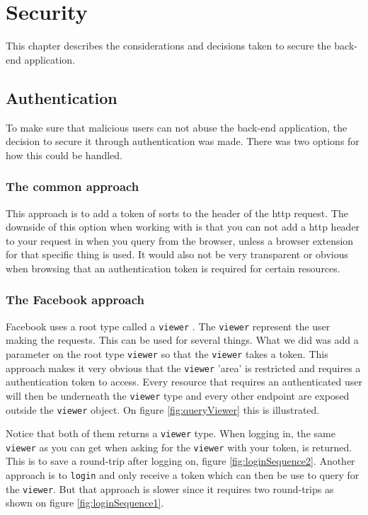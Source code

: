 \chapter{Security}
This chapter describes the considerations and decisions taken to secure the back-end application.

\section{Authentication}
To make sure that malicious users can not abuse the back-end application, the decision to secure it through authentication was made. 
There was two options for how this could be handled. 

\subsection{The common approach}
This approach is to add a token of sorts to the header of the \gls{http} request. 
The downside of this option when working with  is that you can not add a \gls{http} header to your request in  when you query from the browser, unless a browser extension for that specific thing is used. 
It would also not be very transparent or obvious when browsing  that an authentication token is required for certain resources.

\subsection{The Facebook approach}
Facebook uses a root type called a \verb+viewer+ \citep{facebook:viewer}. 
The \verb+viewer+ represent the user making the requests. 
This can be used for several things. 
What we did was add a parameter on the root type \verb+viewer+ so that the \verb+viewer+ takes a token. 
This approach makes it very obvious that the \verb+viewer+ 'area' is restricted and requires a authentication token to access. 
Every resource that requires an authenticated user will then be underneath the \verb+viewer+ type and every other endpoint are exposed outside the \verb+viewer+ object. 
On figure \ref{fig:queryViewer} this is illustrated.


Notice that both of them returns a \verb+viewer+ type. 
When logging in, the same \verb+viewer+ as you can get when asking for the \verb+viewer+ with your token, is returned. 
This is to save a round-trip after logging on, figure \ref{fig:loginSequence2}. 
Another approach is to \verb+login+ and only receive a token which can then be use to query for the \verb+viewer+. 
But that approach is slower since it requires two round-trips as shown on figure \ref{fig:loginSequence1}.


